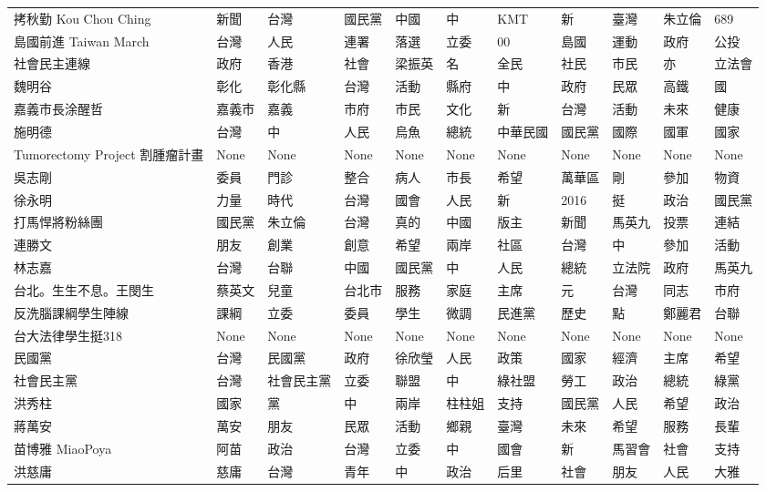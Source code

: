 \documentclass[letterpaper, 10pt, conference]{ieeeconf}   %
\begin{document}
\begin{CJK}{UTF8}{bsmi}
\begin{longtable}[c]{@{}L{2.45cm}L{1.1cm}L{1.1cm}L{1.1cm}L{1.1cm}L{1.1cm}L{1.1cm}L{1.1cm}L{1.1cm}L{1.1cm}L{1.1cm}@{}}
拷秋勤 Kou Chou Ching & 新聞 & 台灣 & 國民黨 & 中國 & 中 & KMT & 新 & 臺灣 & 朱立倫 & 689 \\
島國前進 Taiwan March & 台灣 & 人民 & 連署 & 落選 & 立委 & 00 & 島國 & 運動 & 政府 & 公投 \\
社會民主連線 & 政府 & 香港 & 社會 & 梁振英 & 名 & 全民 & 社民 & 市民 & 亦 & 立法會 \\
魏明谷 & 彰化 & 彰化縣 & 台灣 & 活動 & 縣府 & 中 & 政府 & 民眾 & 高鐵 & 國 \\
嘉義市長涂醒哲 & 嘉義市 & 嘉義 & 市府 & 市民 & 文化 & 新 & 台灣 & 活動 & 未來 & 健康 \\
施明德 & 台灣 & 中 & 人民 & 烏魚 & 總統 & 中華民國 & 國民黨 & 國際 & 國軍 & 國家 \\
Tumorectomy Project 割腫瘤計畫 & None & None & None & None & None & None & None & None & None & None \\
吳志剛 & 委員 & 門診 & 整合 & 病人 & 市長 & 希望 & 萬華區 & 剛 & 參加 & 物資 \\
徐永明 & 力量 & 時代 & 台灣 & 國會 & 人民 & 新 & 2016 & 挺 & 政治 & 國民黨 \\
打馬悍將粉絲團 & 國民黨 & 朱立倫 & 台灣 & 真的 & 中國 & 版主 & 新聞 & 馬英九 & 投票 & 連結 \\
連勝文 & 朋友 & 創業 & 創意 & 希望 & 兩岸 & 社區 & 台灣 & 中 & 參加 & 活動 \\
林志嘉 & 台灣 & 台聯 & 中國 & 國民黨 & 中 & 人民 & 總統 & 立法院 & 政府 & 馬英九 \\
台北。生生不息。王閔生 & 蔡英文 & 兒童 & 台北市 & 服務 & 家庭 & 主席 & 元 & 台灣 & 同志 & 市府 \\
反洗腦課綱學生陣線 & 課綱 & 立委 & 委員 & 學生 & 微調 & 民進黨 & 歷史 & 點 & 鄭麗君 & 台聯 \\
台大法律學生挺318 & None & None & None & None & None & None & None & None & None & None \\
民國黨 & 台灣 & 民國黨 & 政府 & 徐欣瑩 & 人民 & 政策 & 國家 & 經濟 & 主席 & 希望 \\
社會民主黨 & 台灣 & 社會民主黨 & 立委 & 聯盟 & 中 & 綠社盟 & 勞工 & 政治 & 總統 & 綠黨 \\
洪秀柱 & 國家 & 黨 & 中 & 兩岸 & 柱柱姐 & 支持 & 國民黨 & 人民 & 希望 & 政治 \\
蔣萬安 & 萬安 & 朋友 & 民眾 & 活動 & 鄉親 & 臺灣 & 未來 & 希望 & 服務 & 長輩 \\
苗博雅 MiaoPoya & 阿苗 & 政治 & 台灣 & 立委 & 中 & 國會 & 新 & 馬習會 & 社會 & 支持 \\
洪慈庸 & 慈庸 & 台灣 & 青年 & 中 & 政治 & 后里 & 社會 & 朋友 & 人民 & 大雅 \\

\end{longtable}
\end{CJK}
\end{document}
